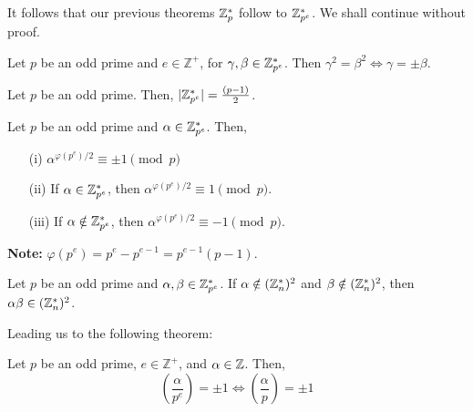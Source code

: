 \newpage

\noindent
It follows that our previous theorems $\mathbb{Z}_p^*$ follow to $\mathbb{Z}_{p^{e}}^*$. We shall continue without proof.
\begin{theo}
    
    Let $p$ be an odd prime and $e\in\mathbb{Z}^+$, for $\gamma,\beta\in\mathbb{Z}_{p^{e}}^*$. Then $\gamma^2=\beta^2\Longleftrightarrow\gamma=\pm\beta$.
    
\end{theo}

\begin{theo}

Let $p$ be an odd prime. Then, $|\mathbb{Z}_{p^{e}}^*|=\frac{(p-1)}{2}$.
\end{theo}

\begin{theo}

\label{theo:euler_criterion_peres}
Let $p$ be an odd prime and $\alpha\in\mathbb{Z}_{p^{e}}^*$. Then,
\begin{enumerate}
    \item[(i)] $\alpha^{\varphi(p^e)/2} \equiv \pm1 \pmod{p}$
    \item[(ii)] If $\alpha\in\mathbb{Z}_{p^{e}}^*$, then $\alpha^{\varphi(p^e)/2}\equiv 1\pmod{p}$.
    \item[(iii)] If $\alpha\notin\mathbb{Z}_{p^{e}}^*$, then $\alpha^{\varphi(p^e)/2}\equiv -1\pmod{p}$.
\end{enumerate}
\noindent
\textbf{Note:} $\varphi(p^e)=p^e-p^{e-1}=p^{e-1}(p-1)$.
\end{theo}

\begin{theo}

    Let \( p \) be an odd prime and \( \alpha, \beta \in \mathbb{Z}_{p^{e}}^* \). 
If \( \alpha \notin (\mathbb{Z}_n^*)^2 \) and \( \beta \notin (\mathbb{Z}_n^*)^2 \), 
then \( \alpha\beta \in (\mathbb{Z}_n^*)^2 \).
\end{theo}
\noindent

\noindent
Leading us to the following theorem:
\begin{theo}

    Let $p$ be an odd prime, $e\in\mathbb{Z^+}$, and $\alpha\in\mathbb{Z}$. Then,
    \Large 
    \[
     \left(\frac{\alpha}{p^e}\right)=\pm1\Longleftrightarrow\left(\frac{\alpha}{p}\right)=\pm1
    \]
    \normalsize
\end{theo}

\newpage

